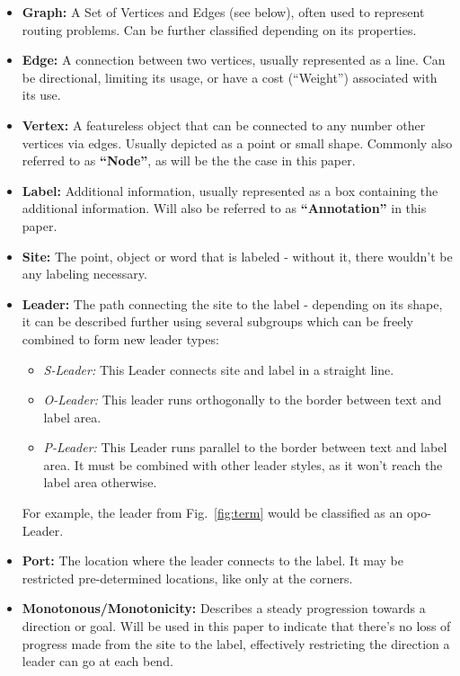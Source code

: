 \documentclass[11pt,a4paper]{article}
\begin{document}
\begin{itemize}
 \item \textbf{Graph:} A Set of Vertices and Edges (see below), often used to represent routing problems. Can be further classified depending on its properties.
 \item \textbf{Edge:} A connection between two vertices, usually represented as a line. Can be directional, limiting its usage, or have a cost (``Weight'') associated with its use.
 \item \textbf{Vertex:} A featureless object that can be connected to any number other vertices via edges. Usually depicted as a point or small shape. Commonly also referred to as \textbf{``Node''}, as will be the the case in this paper.
 \item \textbf{Label:} Additional information, usually represented as a box containing the additional information. Will also be referred to as \textbf{``Annotation''} in this paper.
 \item \textbf{Site:} The point, object or word that is labeled - without it, there wouldn't be any labeling necessary.
 \item \textbf{Leader:} The path connecting the site to the label - depending on its shape, it can be described further using several subgroups which can be freely combined to form new leader types:
  \begin{itemize}
   \item \textit{S-Leader:} This Leader connects site and label in a straight line.
   \item \textit{O-Leader:} This leader runs orthogonally to the border between text and label area.
   \item \textit{P-Leader:} This Leader runs parallel to the border between text and label area. It must be combined with other leader styles, as it won't reach the label area otherwise.
  \end{itemize}
    For example, the leader from Fig.~\ref{fig:term} would be classified as an opo-Leader.
 \item \textbf{Port:} The location where the leader connects to the label. It may be restricted pre-determined locations, like only at the corners.
  \item \textbf{Monotonous/Monotonicity:} Describes a steady progression towards a direction or goal. Will be used in this paper to indicate that there's no loss of progress made from the site to the label, effectively restricting the direction a leader can go at each bend.
\end{itemize}
\end{document}
